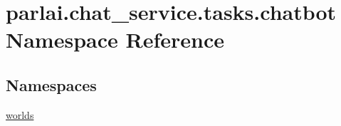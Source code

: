 \hypertarget{namespaceparlai_1_1chat__service_1_1tasks_1_1chatbot}{}\section{parlai.\+chat\+\_\+service.\+tasks.\+chatbot Namespace Reference}
\label{namespaceparlai_1_1chat__service_1_1tasks_1_1chatbot}
\subsection*{Namespaces}
\begin{DoxyCompactItemize}
\item 
 \hyperlink{namespaceparlai_1_1chat__service_1_1tasks_1_1chatbot_1_1worlds}{worlds}
\end{DoxyCompactItemize}
